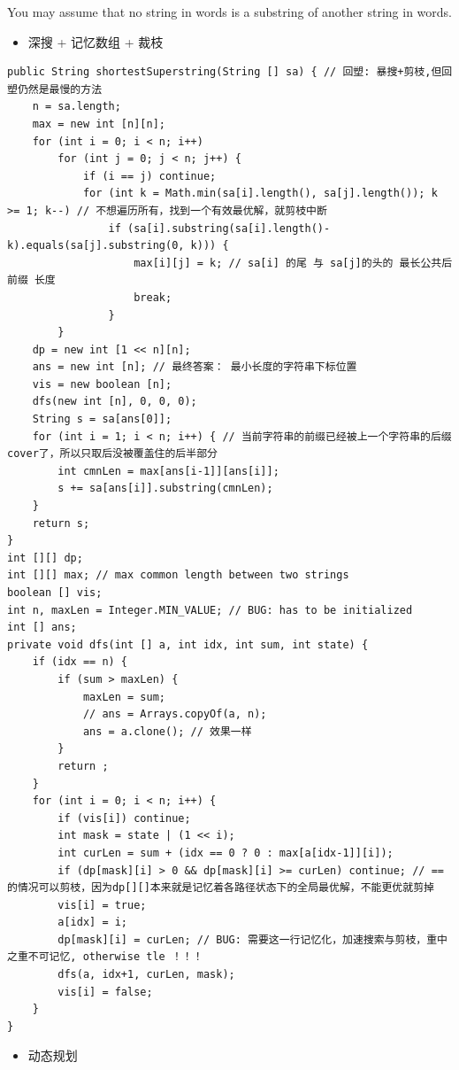 \documentclass[9pt, b5paaper]{book}
\begin{document}
You may assume that no string in words is a substring of another string in words.
\begin{itemize}
\item 深搜 + 记忆数组 + 裁枝
\end{itemize}
\begin{verbatim}
public String shortestSuperstring(String [] sa) { // 回塑: 暴搜+剪枝,但回塑仍然是最慢的方法
    n = sa.length;
    max = new int [n][n];
    for (int i = 0; i < n; i++) 
        for (int j = 0; j < n; j++) {
            if (i == j) continue;
            for (int k = Math.min(sa[i].length(), sa[j].length()); k >= 1; k--) // 不想遍历所有，找到一个有效最优解，就剪枝中断
                if (sa[i].substring(sa[i].length()-k).equals(sa[j].substring(0, k))) {
                    max[i][j] = k; // sa[i] 的尾 与 sa[j]的头的 最长公共后前缀 长度
                    break;
                }
        }                
    dp = new int [1 << n][n];
    ans = new int [n]; // 最终答案： 最小长度的字符串下标位置
    vis = new boolean [n];
    dfs(new int [n], 0, 0, 0);
    String s = sa[ans[0]];
    for (int i = 1; i < n; i++) { // 当前字符串的前缀已经被上一个字符串的后缀cover了，所以只取后没被覆盖住的后半部分
        int cmnLen = max[ans[i-1]][ans[i]];
        s += sa[ans[i]].substring(cmnLen);
    }
    return s;
}
int [][] dp;
int [][] max; // max common length between two strings
boolean [] vis;
int n, maxLen = Integer.MIN_VALUE; // BUG: has to be initialized 
int [] ans;
private void dfs(int [] a, int idx, int sum, int state) {
    if (idx == n) {
        if (sum > maxLen) {
            maxLen = sum;
            // ans = Arrays.copyOf(a, n);
            ans = a.clone(); // 效果一样
        }
        return ;
    }
    for (int i = 0; i < n; i++) {
        if (vis[i]) continue;
        int mask = state | (1 << i);
        int curLen = sum + (idx == 0 ? 0 : max[a[idx-1]][i]);
        if (dp[mask][i] > 0 && dp[mask][i] >= curLen) continue; // == 的情况可以剪枝，因为dp[][]本来就是记忆着各路径状态下的全局最优解，不能更优就剪掉
        vis[i] = true;
        a[idx] = i;
        dp[mask][i] = curLen; // BUG: 需要这一行记忆化，加速搜索与剪枝，重中之重不可记忆, otherwise tle ！！！
        dfs(a, idx+1, curLen, mask);
        vis[i] = false;
    }
}
\end{verbatim}
\begin{itemize}
\item 动态规划
\end{itemize}
\end{document}
